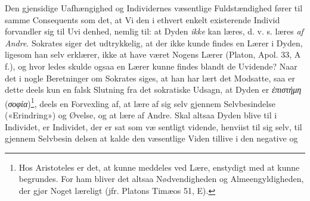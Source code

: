 \documentclass[12pt,a4paper]{book}
\newcommand{\divrule}{\begin{center}\rule{2cm}{0.4pt}\end{center}}
\newcommand{\gk}[1]{\textit{#1}}
\begin{document}
Den gjensidige Uafhængighed og Individernes væsentlige
Fuldstændighed fører til samme Consequents som det, at Vi\-%
den i ethvert enkelt existerende Individ forvandler sig til Uvi\-%
denhed, nemlig til: at Dyden \emph{ikke} kan læres, d. v. s. læres
\emph{af Andre}. Sokrates siger det udtrykkelig, at der ikke kunde
findes en Lærer i Dyden, ligesom han selv erklærer, ikke at
have været Nogens Lærer (Platon, Apol. 33, A f.), og hvor\-%
ledes skulde ogsaa en Lærer kunne findes blandt de Uvidende?
Naar det i nogle Beretninger om Sokrates siges, at han har
lært det Modsatte, saa er dette deels kun en falsk Slutning
fra det sokratiske Udsagn, at Dyden er \gk{ἐπιστήμη} (\gk{σοφία})\footnote{Hos Aristoteles er det, at kunne meddeles ved Lære, enstydigt med
at kunne begrundes. For ham bliver det altsaa Nødvendigheden og
Almeengyldigheden, der gjør Noget læreligt (jfr. Platons Timæos 51, E).}, deels
en Forvexling af, at lære af sig selv gjennem Selvbesindelse
(«Erindring») og Øvelse, og at lære af Andre. Skal altsaa
Dyden blive til i Individet, er Individet, der er sat som væ\-%
sentligt vidende, henviist til sig selv, til gjennem Selvbesin\-%
delsen at kalde den væsentlige Viden tillive i den negative og
\end{document}
